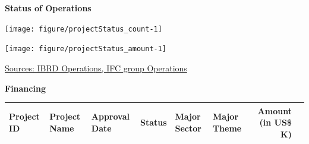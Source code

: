 \documentclass{article}\usepackage[]{graphicx}\usepackage[]{color}
\begin{document}
\begin{minipage}[b]{0.99\textwidth} %
\vspace*{0.5cm}
\raggedright{\color{white!30!blue} \textbf{\large Status of Operations}}
     \vspace*{0.5cm}
     
  \begin{minipage}[t]{0.99\textwidth}
    \begin{minipage}[c]{0.49\textwidth}
      \vspace*{0.2cm}
      \vspace*{0.3cm}


{\centering \texttt{[image: figure/projectStatus\_count-1]} 

}



      \end{minipage}
      \begin{minipage}[c]{0.49\textwidth}


{\centering \texttt{[image: figure/projectStatus\_amount-1]} 

}



      \end{minipage}
 
\raggedright{\footnotesize{\href{http://www.worldbank.org/en/topic/macroeconomics/overview}{Sources: IBRD Operations, IFC group Operations}}}
   \end{minipage}
  
   \begin{minipage}[b]{0.99\textwidth} %
     \vspace*{1cm}
     \begin{minipage}[c]{0.99\textwidth}  
     \raggedright{\color{white!30!blue} \textbf{\large Financing}}
     \vspace*{0.5cm}
     
{\small
\begin{tabular}{l>{\raggedright}p{1in}ll>{\raggedright}p{1in}>{\raggedright}p{1in}rl}
 Project ID & Project Name & Approval Date & Status & Major Sector & Major Theme & Amount (in US\$ K) &  \\ 
  \hline
\end{tabular}
}


\end{minipage}
\end{minipage}
\end{minipage}
\end{document}
